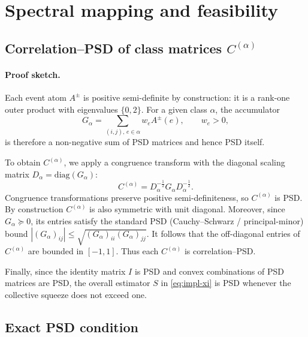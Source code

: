 \documentclass[12pt,letterpaper]{article}
\renewcommand{\thesection}{\Roman{section}}          %
\begin{document}

\clearpage
\appendix
\renewcommand{\thesection}{Appendix~\Alph{section}}
\section{Spectral mapping and feasibility}
\label{sec:SpectralMapping}

\subsection{Correlation--PSD of class matrices \(C^{(\alpha)}\)}

\paragraph{Proof sketch.}
Each event atom \(A^{\pm}\) is positive semi-definite by construction: it is a rank-one
outer product with eigenvalues \(\{0,2\}\). For a given class \(\alpha\), the accumulator
\[
G_\alpha = \sum_{(i,j),\,e\in \alpha} w_e A^{\pm}(e), \qquad w_e > 0,
\]
is therefore a non-negative sum of PSD matrices and hence PSD itself.

To obtain \(C^{(\alpha)}\), we apply a congruence transform with the diagonal scaling
matrix \(D_\alpha = \mathrm{diag}(G_\alpha)\):
\[
C^{(\alpha)} = D_\alpha^{-\tfrac12} G_\alpha D_\alpha^{-\tfrac12}.
\]
Congruence transformations preserve positive semi-definiteness, so \(C^{(\alpha)}\) is PSD.
By construction \(C^{(\alpha)}\) is also symmetric with unit diagonal. Moreover, since \(G_\alpha\succeq 0\),
its entries satisfy the standard PSD (Cauchy--Schwarz / principal-minor) bound
\(|(G_\alpha)_{ij}|\le \sqrt{(G_\alpha)_{ii}(G_\alpha)_{jj}}\). It follows that the off-diagonal
entries of \(C^{(\alpha)}\) are bounded in \([-1,1]\). Thus each \(C^{(\alpha)}\) is correlation--PSD.

Finally, since the identity matrix \(I\) is PSD and convex combinations of PSD matrices are PSD,
the overall estimator \(S\) in \eqref{eq:impl-xi} is PSD whenever the collective squeeze does not exceed one.

\subsection{Exact PSD condition}
\end{document}

